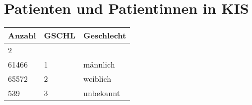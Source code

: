 \section{Patienten und Patientinnen in KIS}
\begin{center}
 \begin{longtable}{|p{2.3cm}|p{2cm}|p{2.5cm}|} 
  \hline
\rowcolor{lightgray} Anzahl & GSCHL & Geschlecht \\ \hline
\endhead
2 &   &  \\ \hline
61466 & 1 & männlich \\ \hline
65572 & 2 & weiblich \\ \hline
539 & 3 & unbekannt \\ \hline
\end{longtable}
\end{center}

